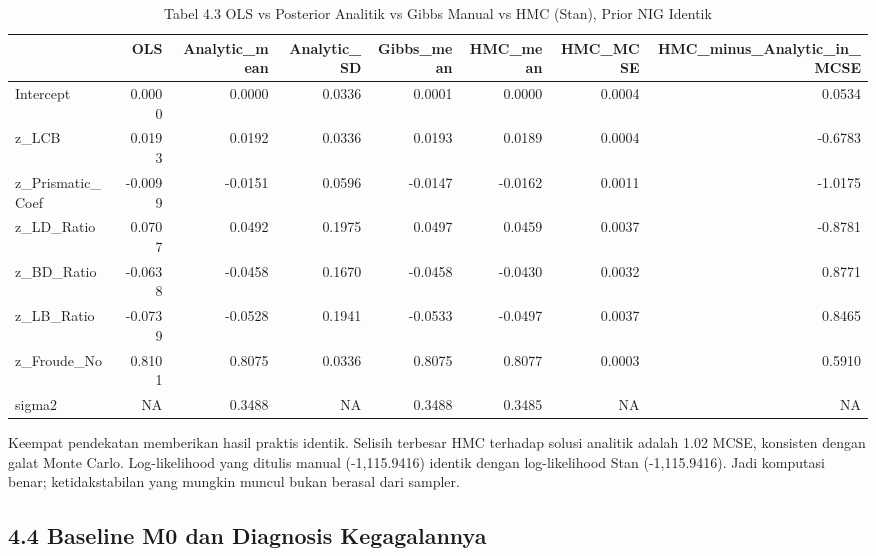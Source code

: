 \documentclass[
]{article}
\begin{document}
\begin{longtable}[t]{lrrrrrrr}
\caption{\label{tab:tabel_komputasi}Tabel 4.3 OLS vs Posterior Analitik vs Gibbs Manual vs HMC (Stan), Prior NIG Identik}\\
\toprule
 & OLS & Analytic\_mean & Analytic\_SD & Gibbs\_mean & HMC\_mean & HMC\_MCSE & HMC\_minus\_Analytic\_in\_MCSE\\
\midrule
Intercept & 0.0000 & 0.0000 & 0.0336 & 0.0001 & 0.0000 & 0.0004 & 0.0534\\
z\_LCB & 0.0193 & 0.0192 & 0.0336 & 0.0193 & 0.0189 & 0.0004 & -0.6783\\
z\_Prismatic\_Coef & -0.0099 & -0.0151 & 0.0596 & -0.0147 & -0.0162 & 0.0011 & -1.0175\\
z\_LD\_Ratio & 0.0707 & 0.0492 & 0.1975 & 0.0497 & 0.0459 & 0.0037 & -0.8781\\
z\_BD\_Ratio & -0.0638 & -0.0458 & 0.1670 & -0.0458 & -0.0430 & 0.0032 & 0.8771\\
\addlinespace
z\_LB\_Ratio & -0.0739 & -0.0528 & 0.1941 & -0.0533 & -0.0497 & 0.0037 & 0.8465\\
z\_Froude\_No & 0.8101 & 0.8075 & 0.0336 & 0.8075 & 0.8077 & 0.0003 & 0.5910\\
sigma2 & NA & 0.3488 & NA & 0.3488 & 0.3485 & NA & NA\\
\bottomrule
\end{longtable}
\endgroup{}

Keempat pendekatan memberikan hasil praktis identik. Selisih terbesar
HMC terhadap solusi analitik adalah 1.02 MCSE, konsisten dengan galat
Monte Carlo. Log-likelihood yang ditulis manual (-1,115.9416) identik
dengan log-likelihood Stan (-1,115.9416). Jadi komputasi benar;
ketidakstabilan yang mungkin muncul bukan berasal dari sampler.

\subsection{4.4 Baseline M0 dan Diagnosis
Kegagalannya}\label{baseline-m0-dan-diagnosis-kegagalannya}

\begingroup\fontsize{8.5}{10.5}\selectfont
\end{document}
